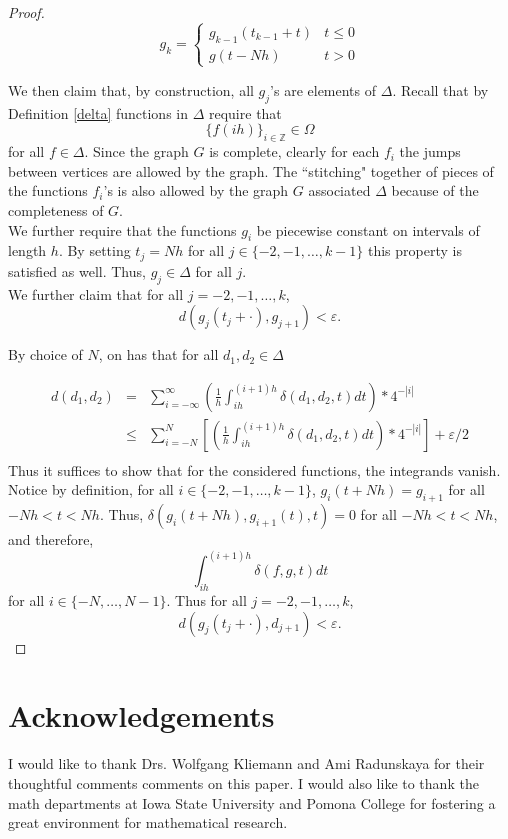 \documentclass[11pt]{article}
\begin{document}
\begin{proof}
   $$g_k=\left\{
     \begin{array}{lr}
       g_{k-1}(t_{k-1}+t) &  t\leq 0\\
       g(t-Nh) &  t>0
     \end{array}
   \right.$$

We then claim that, by construction, all $g_j$'s are elements of $\Delta$.  Recall that by Definition \ref{delta} functions in $\Delta$ require that 
$$\{f(ih)\}_{i\in\mathbb{Z}}\in\Omega$$ for all $f\in\Delta$. Since the graph $G$ is complete, clearly for each $f_i$ the jumps between vertices are allowed by the graph.  The ``stitching" together of pieces of the functions $f_i$'s is also allowed by the graph $G$ associated $\Delta$ because of the completeness of $G$. \\
We further require that the functions $g_i$ be piecewise constant on intervals of length $h$.  By setting $t_j=Nh$ for all $j\in\{-2,-1,\ldots,k-1\}$ this property is satisfied as well.  Thus, $g_j\in\Delta$ for all $j$.
 \\



\indent We further claim that for all $j=-2,-1,\ldots,k$,
$$d(g_j(t_j+\cdot),g_{j+1})<\varepsilon.$$

By choice of $N$, on has that for all $d_1,d_2\in\Delta$

\begin{eqnarray*}
d(d_1,d_2)&=& \displaystyle\sum_{i=-\infty}^\infty \left(\frac{1}{h}\displaystyle\int_{ih}^{(i+1)h}\delta(d_1,d_2,t)dt\right)*4^{-|i|}\\
&\leq& \displaystyle\sum_{i=-N}^N\left[ \left(\frac{1}{h}\displaystyle\int_{ih}^{(i+1)h}\delta(d_1,d_2,t)dt\right)*4^{-|i|}\right] +\varepsilon/2\\
\end{eqnarray*}
Thus it suffices to show that for the considered functions, the integrands vanish.  Notice by definition, for all $i\in\{-2,-1,\ldots,k-1\}$,
$g_i(t+Nh)=g_{i+1}$ for all $-Nh<t<Nh$.  Thus, 
$\delta(g_i(t+Nh),g_{i+1}(t),t)=0$ for all $-Nh<t<Nh$, and therefore,
$$\displaystyle\int_{ih}^{(i+1)h}\delta(f,g,t)dt$$ for all $i\in\{-N,\ldots,N-1\}$.
Thus for all $j=-2,-1,\ldots,k$,
$$d(g_j(t_j+\cdot),d_{j+1})<\varepsilon.$$
\end{proof}

\section*{Acknowledgements}
I would like to thank Drs. Wolfgang Kliemann and Ami Radunskaya for their thoughtful comments comments on this paper.  I would also like to thank the math departments at Iowa State University and Pomona College for fostering a great environment for mathematical research.






\end{document}

